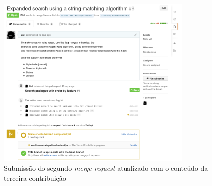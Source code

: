 \begin{figure}[h]
  \centering
	\includegraphics[width=0.85\textwidth]{figuras/pr3}
  \caption{Submissão do segundo \textit{merge request} atualizado com o conteúdo da terceira contribuição}
  \label{fig:pr3_travisok}
\end{figure}
